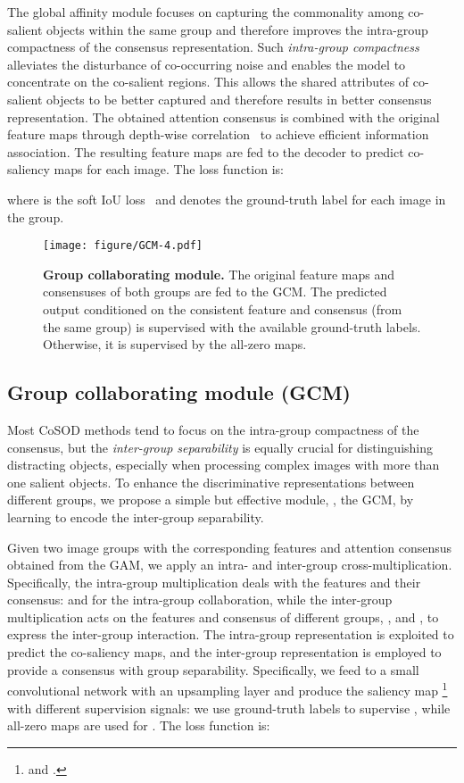 \documentclass[final]{cvpr}
\begin{document}
The global affinity module focuses on capturing the commonality among co-salient objects within the same group and therefore improves the intra-group compactness of the consensus representation. Such \textit{intra-group compactness} alleviates the disturbance of co-occurring noise and enables the model to concentrate on the co-salient regions. This allows the shared attributes of co-salient objects to be better captured and therefore results in better consensus representation.
The obtained attention consensus  is combined with the original feature maps  through depth-wise correlation~\cite{li2019siamrpn++,fan2020few} to achieve efficient information association. The resulting feature maps  are fed to the decoder to predict co-saliency maps  for each image. The loss function is:

where  is the soft IoU loss~\cite{qin2019basnet,li2018interactive} and  denotes the ground-truth label for each image in the group.




\begin{figure}[!t]
\centering
\texttt{[image: figure/GCM-4.pdf]}
\caption{\textbf{Group collaborating module.} The original feature maps and consensuses of both groups are fed to the GCM. The predicted output conditioned on the consistent feature and consensus (from the same group) is supervised with the available ground-truth labels. Otherwise, it is supervised by the all-zero maps.}
\label{fig:gcm}
\end{figure}






\subsection{Group collaborating module (GCM)}

Most CoSOD methods tend to focus on the intra-group compactness of the consensus, but the \textit{inter-group separability} is equally crucial for distinguishing distracting objects, especially when processing complex images with more than one salient objects. 
To enhance the discriminative representations between different groups, we propose a simple but effective module, \ie, the GCM, by learning to encode the inter-group separability.

Given two image groups with the corresponding features  and attention consensus  obtained from the GAM, we apply an intra- and inter-group cross-multiplication. Specifically, the intra-group multiplication deals with the features and their consensus:  and  for the intra-group collaboration, while the inter-group multiplication acts on the features and consensus of different groups, \ie,  and , to express the inter-group interaction.
The intra-group representation  is exploited to predict the co-saliency maps, and the inter-group representation  is employed to provide a consensus with group separability.
Specifically, we feed  to a small convolutional network with an upsampling layer and produce the saliency map \footnote{ and .}
with different supervision signals: we use  ground-truth labels to supervise  , while all-zero maps are used for . The loss function is: 
\end{document}
